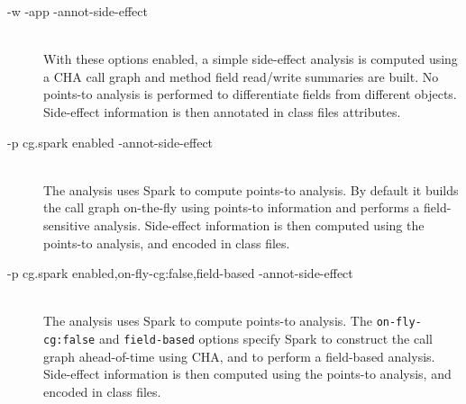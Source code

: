 \documentclass{article}
\begin{document}
\begin{description}

\item[-w -app -annot-side-effect]\ \\ With these options enabled, a
simple side-effect analysis is computed using a CHA call graph and
method field read/write summaries are built. No points-to analysis is
performed to differentiate fields from different objects. Side-effect
information is then annotated in class files attributes. 

\item[-p cg.spark enabled -annot-side-effect]\ \\ 
The analysis uses Spark to compute points-to analysis. By default
it builds the call graph on-the-fly using points-to information and
performs a field-sensitive analysis. Side-effect information is then
computed using the points-to analysis, and encoded in class files.



\item[-p cg.spark enabled,on-fly-cg:false,field-based -annot-side-effect]\ \\ 
The analysis uses Spark to compute points-to analysis. The
{\tt on-fly-cg:false} and {\tt field-based} options specify Spark 
to construct the call graph ahead-of-time using CHA, and to perform a
field-based analysis.  
Side-effect information is then
computed using the points-to analysis, and encoded in class files.
\end{description}
\end{document}
